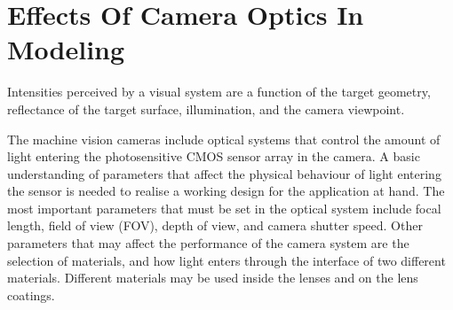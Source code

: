 \documentclass[12pt,a4paper,oneside,pdftex]{report}
\begin{document}



\section{Effects Of Camera Optics In Modeling}
\label{section:effects_of_camera_optics_in_modeling}


Intensities perceived by a visual system are a function of the target geometry, reflectance of the target surface, illumination, and the camera viewpoint.

The machine vision cameras include optical systems that control the amount of light entering the photosensitive CMOS sensor array in the camera. A basic understanding of parameters that affect the physical behaviour of light entering the sensor is needed to realise a working design for the application at hand. The most important parameters that must be set in the optical system include focal length, field of view (FOV), depth of view, and camera shutter speed. Other parameters that may affect the performance of the camera system are the selection of materials, and how light enters through the interface of two different materials. Different materials may be used inside the lenses and on the lens coatings. 
\end{document}
